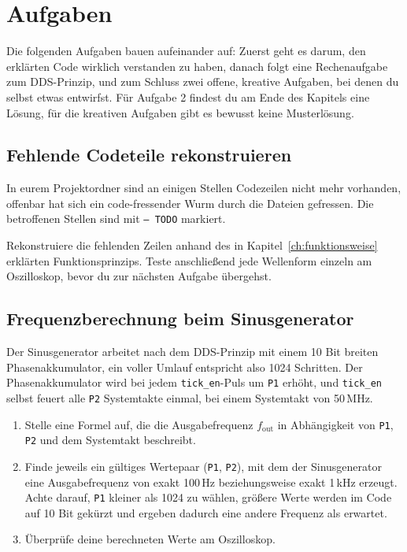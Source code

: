 \chapter{Aufgaben}

Die folgenden Aufgaben bauen aufeinander auf: Zuerst geht es darum, den erklärten Code wirklich verstanden zu haben, danach folgt eine Rechenaufgabe zum DDS-Prinzip, und zum Schluss zwei offene, kreative Aufgaben, bei denen du selbst etwas entwirfst. Für Aufgabe 2 findest du am Ende des Kapitels eine Lösung, für die kreativen Aufgaben gibt es bewusst keine Musterlösung.

\section{Fehlende Codeteile rekonstruieren}

In eurem Projektordner sind an einigen Stellen Codezeilen nicht mehr vorhanden, offenbar hat sich ein code-fressender Wurm durch die Dateien gefressen. Die betroffenen Stellen sind mit \texttt{-- TODO} markiert.

Rekonstruiere die fehlenden Zeilen anhand des in Kapitel~\ref{ch:funktionsweise} erklärten Funktionsprinzips. Teste anschließend jede Wellenform einzeln am Oszilloskop, bevor du zur nächsten Aufgabe übergehst.

\section{Frequenzberechnung beim Sinusgenerator}
\label{sec:frequenzberechnung}

Der Sinusgenerator arbeitet nach dem DDS-Prinzip mit einem 10 Bit breiten Phasenakkumulator, ein voller Umlauf entspricht also 1024 Schritten. Der Phasenakkumulator wird bei jedem \texttt{tick\_en}-Puls um \texttt{P1} erhöht, und \texttt{tick\_en} selbst feuert alle \texttt{P2} Systemtakte einmal, bei einem Systemtakt von 50\,MHz.

\begin{enumerate}
    \item Stelle eine Formel auf, die die Ausgabefrequenz $f_{\text{out}}$ in Abhängigkeit von \texttt{P1}, \texttt{P2} und dem Systemtakt beschreibt.
    \item Finde jeweils ein gültiges Wertepaar (\texttt{P1}, \texttt{P2}), mit dem der Sinusgenerator eine Ausgabefrequenz von exakt 100\,Hz beziehungsweise exakt 1\,kHz erzeugt. Achte darauf, \texttt{P1} kleiner als 1024 zu wählen, größere Werte werden im Code auf 10 Bit gekürzt und ergeben dadurch eine andere Frequenz als erwartet.
    \item Überprüfe deine berechneten Werte am Oszilloskop.
\end{enumerate}

